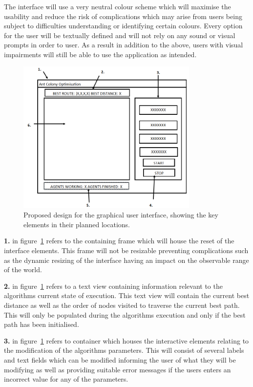 \documentclass[10pt,a4paper]{article}
\begin{document}
The interface will use a very neutral colour scheme which will maximise the usability and reduce the risk of complications which may arise from users being subject to difficulties understanding or identifying certain colours. Every option for the user will be textually defined and will not rely on any sound or visual prompts in order to user. As a result in addition to the above, users with visual impairments will still be able to use the application as intended.

\begin{figure}[H]
\centering
\includegraphics[width=0.8\textwidth]{screen}
\caption{Proposed design for the graphical user interface, showing the key elements in their planned locations.}
\label{fig:interface}
\end{figure}

\noindent
\textbf{1.} in figure~\ref{fig:interface} refers to the containing frame which will house the reset of the interface elements. This frame will not be resizable preventing complications such as the dynamic resizing of the interface having an impact on the observable range of the world.

\textbf{2.} in figure~\ref{fig:interface} refers to a text view containing information relevant to the algorithms current state of execution. This text view will contain the current best distance as well as the order of nodes visited to traverse the current best path. This will only be populated during the algorithms execution and only if the best path has been initialised.

\textbf{3.} in figure~\ref{fig:interface} refers to container which houses the interactive elements relating to the modification of the algorithms parameters. This will consist of several labels and text fields which can be modified informing the user of what they will be modifying as well as providing suitable error messages if the users enters an incorrect value for any of the parameters.
\end{document}
